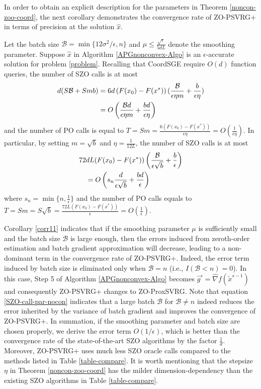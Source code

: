 In order to obtain an explicit description for the  parameters in Theorem \ref{noncon-zoo-coord}, the next corollary demonstrates the convergence rate of ZO-PSVRG+ in terms of precision at the solution $\hat{x}$.
 \begin{corollary}\label{corr11}
Let the batch size $\mathcal{B} = \min\{12\sigma^2/\epsilon, n\}$ and $\mu \leq \frac{\sqrt{\epsilon}}{5{dL}}$ denote the smoothing parameter. Suppose $\hat{x}$ in Algorithm \ref{APGnonconvex-Algo} is an $\epsilon$-accurate solution for problem \eqref{problem}. Recalling that CoordSGE require $O(d)$ function queries, the number of SZO calls is at most 
\begin{align}
d(S\mathcal{B}+Smb) &= 6d \left(F(x_0) - F({x}^*)\right) (\frac{\mathcal{B}}{\epsilon\eta m}+\frac{b}{\epsilon\eta})\notag\\
& = O\left(\frac{\mathcal{B}d}{\epsilon\eta m}+\frac{bd}{\epsilon\eta}\right)\label{SZO-call-nocon}
\end{align}
and the number of PO calls is equal to $T = Sm = \frac{6\left(F(x_0) - F({x}^*)\right)}{\epsilon\eta} = O\left(\frac{1}{\epsilon\eta}\right)$. In particular, by setting $m=\sqrt{b}$ and $\eta = \frac{1}{12L}$, the number of SZO calls is at most 
\begin{align}
72&d L (F(x_0)-F(x^*))\left(\frac{\mathcal{B}}{\epsilon\sqrt{b}}+\frac{b}{\epsilon}\right)\notag\\
& = O\left(s_n\frac{d}{\epsilon \sqrt{b}}+\frac{bd}{\epsilon}\right)\label{SZO-call-par-nocon}
\end{align}
where $s_n = \min\{n,\frac{1}{\epsilon}\}$ and the number of PO calls equals to $T = Sm = S\sqrt{b} = \frac{72 L \left(F(x_0) - F({x}^*)\right)}{\epsilon} = O\left(\frac{1}{\epsilon}\right)$. 
\end{corollary}
Corollary \ref{corr11} indicates that if the smoothing parameter $\mu$ is sufficiently small and the batch size $\mathcal{B}$ is large enough, then the errors induced from zeroth-order estimation and batch gradient approximation will decrease, leading to a non-dominant term in the convergence rate of ZO-PSVRG+. Indeed, the error term induced by batch size  is eliminated only when $\mathcal{B} = n$  (i.e., $I(\mathcal{B} < n) = 0$). 
In
this case, Step 5 of Algorithm \ref{APGnonconvex-Algo} becomes $\hat{g}^s = \hat{\nabla} f(\tilde{x}^{s-1})$ and consequently ZO-PSVRG+ changes to ZO-ProxSVRG. Note that equation \eqref{SZO-call-par-nocon} indicates that a large batch $\mathcal{B}$  for $\mathcal{B} \neq n$ indeed reduces the error inherited by the variance of batch gradient and improves the convergence of ZO-PSVRG+. In summation, if the smoothing parameter and batch size are chosen properly, we derive the error term $O(1/\epsilon)$, which is better than the convergence rate of the state-of-the-art SZO algorithms by the factor $\frac{1}{d}$. Moreover, ZO-PSVRG+ uses much less SZO oracle calls compared to the methods listed in Table \ref{table-compare}. It is worth mentioning that the stepsize $\eta$ in Theorem \ref{noncon-zoo-coord} has the milder dimension-dependency than the existing SZO algorithms in Table \ref{table-compare}. 
